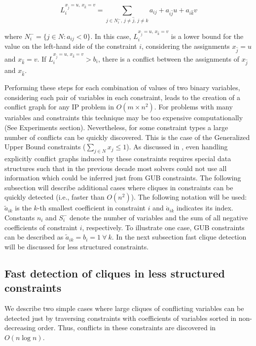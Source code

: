 \documentclass{endm}
\begin{document}
\begin{equation}\label{li}
L_{i}^{x_{\hat{j}} = u,\, x_{\hat{k}} = v}=\sum_{j\in N_{i}^{-},\, j\neq\hat{j},\, j\neq\hat{k}}a_{ij}+a_{i\hat{j}}u+a_{i\hat{k}}v 
\end{equation}

\noindent where $N_{i}^{-} = \{j \in N : a_{ij} < 0\}$. In this case, $L_{i}^{x_{\hat{j}} = u,\, x_{\hat{k}} = v}$ is a lower bound for the value on the left-hand side  of the constraint $i$, considering the assignments $x_{\hat{j}} = u$ and $x_{\hat{k}} = v$. If $L_{i}^{x_{\hat{j}} = u,\, x_{\hat{k}} = v} > b_{i}$, there is a conflict between the assignments of $x_{\hat{j}}$ and $x_{\hat{k}}$. 

Performing these steps for each combination of values of two binary variables, considering each pair of variables in each constraint, leads to the creation of a conflict graph for any IP problem in $O(m \times n^2)$. For problems with many variables and constraints this technique may be too expensive computationally (See Experiments section). Nevertheless, for some constraint types a large number of conflicts can be quickly discovered. This is the case of the Generalized Upper Bound constraints ($\sum_{j\in N}x_j \leq 1$). As discussed in \cite{atamturk}, even handling explicitly conflict graphs induced by these constraints requires special data structures such that in the previous decade most solvers could not use all information which could be inferred just from GUB constraints. The following subsection will describe additional cases where cliques in constraints can be quickly detected (i.e., faster than $O(n^2)$). The following notation will be used: $\tilde{a}_{ik}$ is the $k$-th smallest coefficient in constraint $i$ and $\acute{a}_{ik}$ indicates its index. Constants $n_i$ and $S_i^-$ denote the number of variables and the sum of all negative coefficients of constraint $i$, respectively. To illustrate one case, GUB constraints can be described as $\tilde{a}_{ik}=b_i=1 \ \forall \ k$. In the next subsection fast clique detection will be discussed for less structured constraints.


\subsection{Fast detection of cliques in less structured constraints}

We describe two simple cases where large cliques of conflicting variables can be detected just by traversing constraints with  coefficients of variables sorted in non-decreasing order. Thus, conflicts in these constraints are discovered in $O( n \log n)$.
\end{document}
